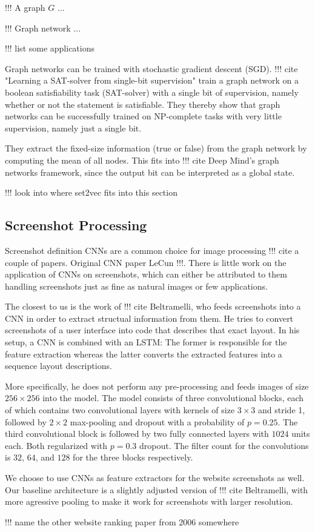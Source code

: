!!! A graph $G$ ...

!!! Graph network ...

!!! list some applications

Graph networks can be trained with stochastic gradient descent (SGD). !!! cite "Learning a SAT-solver from single-bit supervision" train a graph network on a boolean satisfiability task (SAT-solver) with a single bit of supervision, namely whether or not the statement is satisfiable. They thereby show that graph networks can be successfully trained on NP-complete tasks with very little supervision, namely just a single bit.

They extract the fixed-size information (true or false) from the graph network by computing the mean of all nodes. This fits into !!! cite Deep Mind's graph networks framework, since the output bit can be interpreted as a global state.

!!! look into where set2vec fits into this section


\subsection{Screenshot Processing}

Screenshot definition
CNNs are a common choice for image processing !!! cite a couple of papers. Original CNN paper LeCun !!!. There is little work on the application of CNNs on screenshots, which can either be attributed to them handling screenshots just as fine as natural images or few applications.

The closest to us is the work of !!! cite Beltramelli, who feeds screenshots into a CNN in order to extract structual information from them. He tries to convert screenshots of a user interface into code that describes that exact layout. In his setup, a CNN is combined with an LSTM: The former is responsible for the feature extraction whereas the latter converts the extracted features into a sequence layout descriptions.

More specifically, he does not perform any pre-processing and feeds images of size $256\times 256$ into the model. The model consists of three convolutional blocks, each of which contains two convolutional layers with kernels of size $3\times 3$ and stride 1, followed by $2\times 2$ max-pooling and dropout with a probability of $p=0.25$. The third convolutional block is followed by two fully connected layers with $1024$ units each. Both regularized with $p=0.3$ dropout. The filter count for the convolutions is $32$, $64$, and $128$ for the three blocks respectively. 

We choose to use CNNs as feature extractors for the website screenshots as well. Our baseline architecture is a slightly adjusted version of !!! cite Beltramelli, with more agressive pooling to make it work for screenshots with larger resolution.

!!! name the other website ranking paper from 2006 somewhere